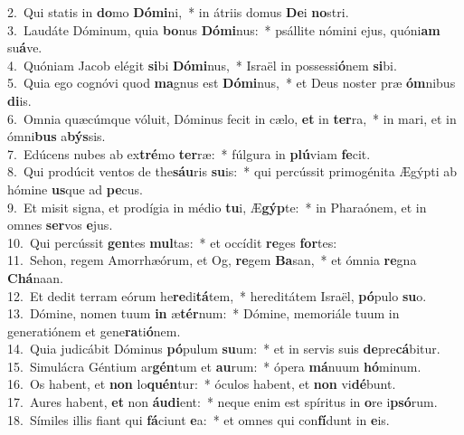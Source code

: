 {2.~}Qui statis in \textbf{do}mo \textbf{Dó}\textbf{mi}ni,~* in átriis domus \textbf{De}i \textbf{no}stri.\\
{3.~}Laudáte Dóminum, quia \textbf{bo}nus \textbf{Dó}\textbf{mi}nus:~* psállite nómini ejus, quóni\textbf{am} su\textbf{á}ve.\\
{4.~}Quóniam Jacob elégit \textbf{si}bi \textbf{Dó}\textbf{mi}nus,~* Israël in possessi\textbf{ó}nem \textbf{si}bi.\\
{5.~}Quia ego cognóvi quod \textbf{ma}gnus est \textbf{Dó}\textbf{mi}nus,~* et Deus noster præ \textbf{óm}nibus \textbf{di}is.\\
{6.~}Omnia quæcúmque vóluit, Dóminus fecit in cælo, \textbf{et} in \textbf{ter}ra,~* in mari, et in ómni\textbf{bus} a\textbf{býs}sis.\\
{7.~}Edúcens nubes ab ex\textbf{tré}mo \textbf{ter}ræ:~* fúlgura in \textbf{plú}viam \textbf{fe}cit.\\
{8.~}Qui prodúcit ventos de the\textbf{sáu}ris \textbf{su}is:~* qui percússit primogénita Ægýpti ab hómine \textbf{us}que ad \textbf{pe}cus.\\
{9.~}Et misit signa, et prodígia in médio \textbf{tu}i, Æ\textbf{gýp}te:~* in Pharaónem, et in omnes \textbf{ser}vos \textbf{e}jus.\\
{10.~}Qui percússit \textbf{gen}tes \textbf{mul}tas:~* et occídit \textbf{re}ges \textbf{for}tes:\\
{11.~}Sehon, regem Amorrhæórum, et Og, \textbf{re}gem \textbf{Ba}san,~* et ómnia \textbf{re}gna \textbf{Chá}naan.\\
{12.~}Et dedit terram eórum he\textbf{re}di\textbf{tá}tem,~* hereditátem Israël, \textbf{pó}pulo \textbf{su}o.\\
{13.~}Dómine, nomen tuum \textbf{in} æ\textbf{tér}num:~* Dómine, memoriále tuum in generatiónem et gene\textbf{ra}ti\textbf{ó}nem.\\
{14.~}Quia judicábit Dóminus \textbf{pó}pulum \textbf{su}um:~* et in servis suis \textbf{de}pre\textbf{cá}bitur.\\
{15.~}Simulácra Géntium ar\textbf{gén}tum et \textbf{au}rum:~* ópera \textbf{má}nuum \textbf{hó}minum.\\
{16.~}Os habent, et \textbf{non} lo\textbf{quén}tur:~* óculos habent, et \textbf{non} vi\textbf{dé}bunt.\\
{17.~}Aures habent, \textbf{et} non \textbf{áu}\textbf{di}ent:~* neque enim est spíritus in \textbf{o}re i\textbf{psó}rum.\\
{18.~}Símiles illis fiant qui \textbf{fá}ciunt \textbf{e}a:~* et omnes qui con\textbf{fí}dunt in \textbf{e}is.\\
